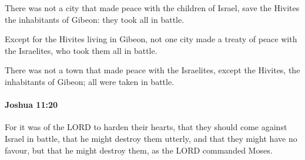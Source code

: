 			\begin{versebox}
					\item[BHS] 
					\item[ASV] There was not a city that made peace with the children of Israel, save the Hivites the inhabitants of Gibeon: they took all in battle.
					\item[NIV] Except for the Hivites living in Gibeon, not one city made a treaty of peace with the Israelites, who took them all in battle.
					\item[NRSV] There was not a town that made peace with the Israelites, except the Hivites, the inhabitants of Gibeon; all were taken in battle.
			\end{versebox}

		\paragraph{Joshua 11:20} %
			\label{JOSHUA-11-20}

			For it was of the LORD to harden their hearts, that they should come against Israel in battle, that he might destroy them utterly, and that they might have no favour, but that he might destroy them, as the LORD commanded Moses.

